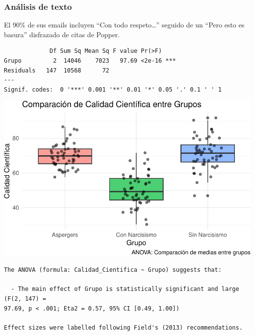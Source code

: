 \documentclass[
  10pt]{article}
\begin{document}
\subsubsection{Análisis de texto}\label{anuxe1lisis-de-texto}

El 90\% de sus emails incluyen ``Con todo respeto\ldots{}'' seguido de
un ``Pero esto es basura'' disfrazado de citas de Popper.

\begin{verbatim}
             Df Sum Sq Mean Sq F value Pr(>F)    
Grupo         2  14046    7023   97.69 <2e-16 ***
Residuals   147  10568      72                   
---
Signif. codes:  0 '***' 0.001 '**' 0.01 '*' 0.05 '.' 0.1 ' ' 1
\end{verbatim}

\includegraphics{template_files/figure-pdf/unnamed-chunk-6-1.pdf}

\begin{tcolorbox}[enhanced jigsaw, colframe=quarto-callout-tip-color-frame, toprule=.15mm, opacitybacktitle=0.6, arc=.35mm, coltitle=black, title=\textcolor{quarto-callout-tip-color}{\faLightbulb}\hspace{0.5em}{Tip}, breakable, rightrule=.15mm, bottomtitle=1mm, titlerule=0mm, leftrule=.75mm, opacityback=0, colbacktitle=quarto-callout-tip-color!10!white, colback=white, left=2mm, bottomrule=.15mm, toptitle=1mm]

\begin{verbatim}
The ANOVA (formula: Calidad_Cientifica ~ Grupo) suggests that:

  - The main effect of Grupo is statistically significant and large (F(2, 147) =
97.69, p < .001; Eta2 = 0.57, 95% CI [0.49, 1.00])

Effect sizes were labelled following Field's (2013) recommendations.
\end{verbatim}

\end{tcolorbox}
\end{document}
